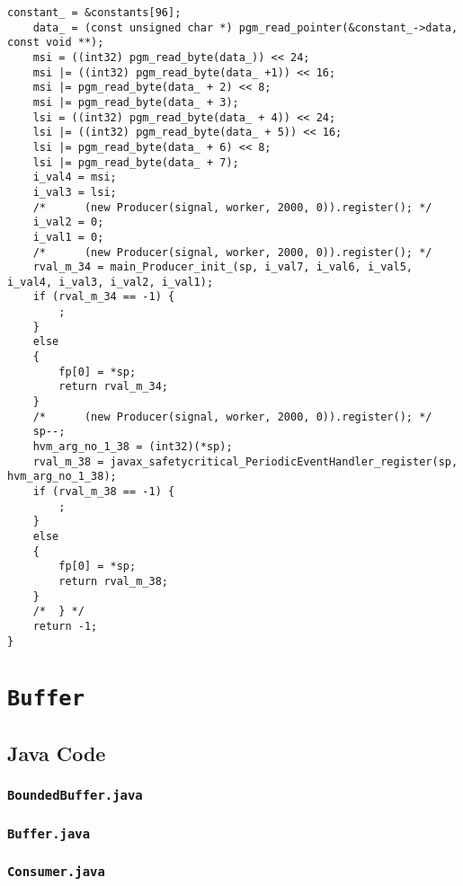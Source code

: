 \begin{landscape}
\begin{multicols}{2}
\begin{lstlisting}[firstnumber=53988]
	constant_ = &constants[96];
	data_ = (const unsigned char *) pgm_read_pointer(&constant_->data, const void **);
	msi = ((int32) pgm_read_byte(data_)) << 24;
	msi |= ((int32) pgm_read_byte(data_ +1)) << 16;
	msi |= pgm_read_byte(data_ + 2) << 8;
	msi |= pgm_read_byte(data_ + 3);
	lsi = ((int32) pgm_read_byte(data_ + 4)) << 24;
	lsi |= ((int32) pgm_read_byte(data_ + 5)) << 16;
	lsi |= pgm_read_byte(data_ + 6) << 8;
	lsi |= pgm_read_byte(data_ + 7);
	i_val4 = msi;
	i_val3 = lsi;
	/*		(new Producer(signal, worker, 2000, 0)).register(); */
	i_val2 = 0;
	i_val1 = 0;
	/*		(new Producer(signal, worker, 2000, 0)).register(); */
	rval_m_34 = main_Producer_init_(sp, i_val7, i_val6, i_val5, i_val4, i_val3, i_val2, i_val1);
	if (rval_m_34 == -1) {
		;
	}
	else
	{
		fp[0] = *sp;
		return rval_m_34;
	}
	/*		(new Producer(signal, worker, 2000, 0)).register(); */
	sp--;
	hvm_arg_no_1_38 = (int32)(*sp);
	rval_m_38 = javax_safetycritical_PeriodicEventHandler_register(sp, hvm_arg_no_1_38);
	if (rval_m_38 == -1) {
		;
	}
	else
	{
		fp[0] = *sp;
		return rval_m_38;
	}
	/*	} */
	return -1;
}
\end{lstlisting}


\section{\texorpdfstring{\texttt{Buffer}}{Buffer}}
\label{Buffer-code-section}

\subsection{Java Code}
\label{Buffer-java-code-subsection}

\subsubsection{\texttt{BoundedBuffer.java}}


\subsubsection{\texttt{Buffer.java}}


\subsubsection{\texttt{Consumer.java}}



\end{multicols}
\end{landscape}
